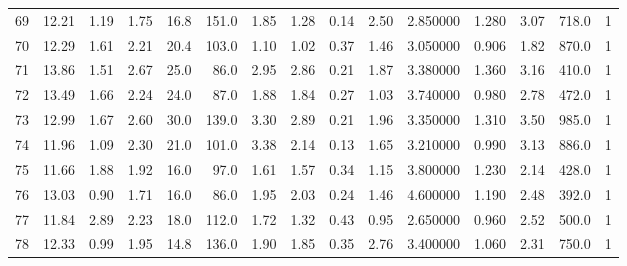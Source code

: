 \documentclass{article}
\begin{document}
\begin{tabular}{lrrrrrrrrrrrrrr}
    69  &    12.21 &        1.19 &  1.75 &               16.8 &      151.0 &           1.85 &        1.28 &                  0.14 &             2.50 &         2.850000 &  1.280 &                          3.07 &    718.0 &      1 \\
    70  &    12.29 &        1.61 &  2.21 &               20.4 &      103.0 &           1.10 &        1.02 &                  0.37 &             1.46 &         3.050000 &  0.906 &                          1.82 &    870.0 &      1 \\
    71  &    13.86 &        1.51 &  2.67 &               25.0 &       86.0 &           2.95 &        2.86 &                  0.21 &             1.87 &         3.380000 &  1.360 &                          3.16 &    410.0 &      1 \\
    72  &    13.49 &        1.66 &  2.24 &               24.0 &       87.0 &           1.88 &        1.84 &                  0.27 &             1.03 &         3.740000 &  0.980 &                          2.78 &    472.0 &      1 \\
    73  &    12.99 &        1.67 &  2.60 &               30.0 &      139.0 &           3.30 &        2.89 &                  0.21 &             1.96 &         3.350000 &  1.310 &                          3.50 &    985.0 &      1 \\
    74  &    11.96 &        1.09 &  2.30 &               21.0 &      101.0 &           3.38 &        2.14 &                  0.13 &             1.65 &         3.210000 &  0.990 &                          3.13 &    886.0 &      1 \\
    75  &    11.66 &        1.88 &  1.92 &               16.0 &       97.0 &           1.61 &        1.57 &                  0.34 &             1.15 &         3.800000 &  1.230 &                          2.14 &    428.0 &      1 \\
    76  &    13.03 &        0.90 &  1.71 &               16.0 &       86.0 &           1.95 &        2.03 &                  0.24 &             1.46 &         4.600000 &  1.190 &                          2.48 &    392.0 &      1 \\
    77  &    11.84 &        2.89 &  2.23 &               18.0 &      112.0 &           1.72 &        1.32 &                  0.43 &             0.95 &         2.650000 &  0.960 &                          2.52 &    500.0 &      1 \\
    78  &    12.33 &        0.99 &  1.95 &               14.8 &      136.0 &           1.90 &        1.85 &                  0.35 &             2.76 &         3.400000 &  1.060 &                          2.31 &    750.0 &      1 \\

\end{tabular}
\end{document}
